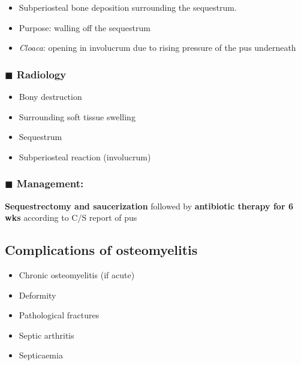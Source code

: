 \documentclass[
  12pt,
]{memoir}
\providecommand{\tightlist}{%
  \setlength{\itemsep}{0pt}\setlength{\parskip}{0pt}}
\begin{document}
\begin{itemize}
\tightlist
\item
  Subperiosteal bone deposition surrounding the sequestrum.
\item
  Purpose: walling off the sequestrum
\item
  \emph{Cloaca}: opening in involucrum due to rising pressure of the pus
  underneath
\end{itemize}

\hypertarget{blacksquare-radiology-1}{%
\subsubsection{\texorpdfstring{\(\blacksquare\)
Radiology}{\textbackslash blacksquare Radiology}}\label{blacksquare-radiology-1}}

\begin{itemize}
\tightlist
\item
  Bony destruction
\item
  Surrounding soft tissue swelling
\item
  Sequestrum
\item
  Subperiosteal reaction (involucrum)
\end{itemize}

\hypertarget{blacksquare-management}{%
\subsubsection{\texorpdfstring{\(\blacksquare\)
Management:}{\textbackslash blacksquare Management:}}\label{blacksquare-management}}

\textbf{Sequestrectomy and saucerization} followed by \textbf{antibiotic
therapy for 6 wks} according to C/S report of pus

\hypertarget{complications-of-osteomyelitis}{%
\subsection{Complications of
osteomyelitis}\label{complications-of-osteomyelitis}}

\begin{itemize}
\tightlist
\item
  Chronic osteomyelitis (if acute)
\item
  Deformity
\item
  Pathological fractures
\item
  Septic arthritis
\item
  Septicaemia
\end{itemize}
\end{document}
